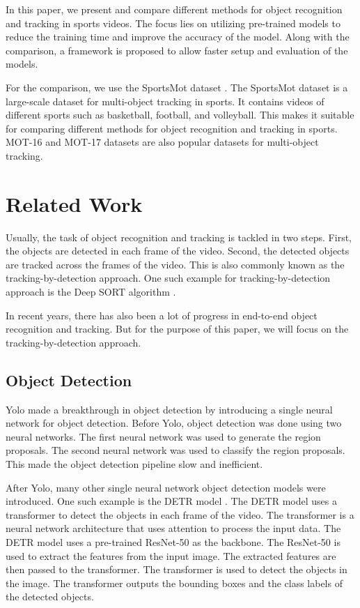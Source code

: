 \documentclass[runningheads]{llncs}
\begin{document}
In this paper, we present and compare different methods for object recognition and tracking in sports videos.
The focus lies on utilizing pre-trained models to reduce the training time and improve the accuracy of the model.
Along with the comparison, a framework is proposed to allow faster setup and evaluation of the models.

For the comparison, we use the SportsMot dataset \cite{cui2023sportsmot}.
The SportsMot dataset is a large-scale dataset for multi-object tracking in sports.
It contains videos of different sports such as basketball, football, and volleyball.
This makes it suitable for comparing different methods for object recognition and tracking in sports.
MOT-16 and MOT-17 datasets \cite{milan2016mot16} are also popular datasets for multi-object tracking.


\section{Related Work}
Usually, the task of object recognition and tracking is tackled in two steps.
First, the objects are detected in each frame of the video.
Second, the detected objects are tracked across the frames of the video.
This is also commonly known as the tracking-by-detection approach.
One such example for tracking-by-detection approach is the Deep SORT algorithm \cite{DBLP:journals/corr/abs-1907-03465}.

In recent years, there has also been a lot of progress in end-to-end object recognition and tracking.
But for the purpose of this paper, we will focus on the tracking-by-detection approach.



\subsection{Object Detection}

Yolo \cite{yolo2015} made a breakthrough in object detection by introducing a single neural network for object detection.
Before Yolo, object detection was done using two neural networks.
The first neural network was used to generate the region proposals.
The second neural network was used to classify the region proposals.
This made the object detection pipeline slow and inefficient.

After Yolo, many other single neural network object detection models were introduced.
One such example is the DETR model \cite{detr2020}.
The DETR model uses a transformer \cite{transformer2017} to detect the objects in each frame of the video.
The transformer is a neural network architecture that uses attention to process the input data.
The DETR model uses a pre-trained ResNet-50 \cite{resnet2015} as the backbone.
The ResNet-50 is used to extract the features from the input image.
The extracted features are then passed to the transformer.
The transformer is used to detect the objects in the image.
The transformer outputs the bounding boxes and the class labels of the detected objects.
\end{document}
